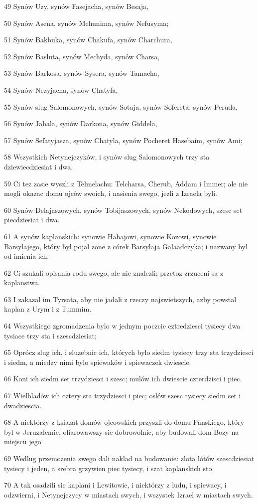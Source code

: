 \par 49 Synów Uzy, synów Fasejacha, synów Besaja,
\par 50 Synów Asena, synów Mehunima, synów Nefusyma;
\par 51 Synów Bakbuka, synów Chakufa, synów Charchura,
\par 52 Synów Basluta, synów Mechyda, synów Charsa,
\par 53 Synów Barkosa, synów Sysera, synów Tamacha,
\par 54 Synów Nezyjacha, synów Chatyfa,
\par 55 Synów slug Salomonowych, synów Sotaja, synów Sofereta, synów Peruda,
\par 56 Synów Jahala, synów Darkona, synów Giddela,
\par 57 Synów Sefatyjasza, synów Chatyla, synów Pocheret Hasebaim, synów Ami;
\par 58 Wszystkich Netynejczyków, i synów slug Salomonowych trzy sta dziewiecdziesiat i dwa.
\par 59 Ci tez zasie wyszli z Telmelachu: Telcharsa, Cherub, Addam i Immer; ale nie mogli okazac domu ojców swoich, i nasienia swego, jezli z Izraela byli.
\par 60 Synów Delajaszowych, synów Tobijaszowych, synów Nekodowych, szesc set piecdziesiat i dwa.
\par 61 A synów kaplanskich: synowie Habajowi, synowie Kozowi, synowie Barsylajego, który byl pojal zone z córek Barsylaja Galaadczyka; i nazwany byl od imienia ich.
\par 62 Ci szukali opisania rodu swego, ale nie znalezli; przetoz zrzuceni sa z kaplanstwa.
\par 63 I zakazal im Tyrsata, aby nie jadali z rzeczy najswietszych, azby powstal kaplan z Urym i z Tummim.
\par 64 Wszystkiego zgromadzenia bylo w jednym poczcie cztredziesci tysiecy dwa tysiace trzy sta i szescdziesiat;
\par 65 Oprócz slug ich, i sluzebnic ich, których bylo siedm tysiecy trzy sta trzydziesci i siedm, a miedzy nimi bylo spiewaków i spiewaczek dwiescie.
\par 66 Koni ich siedm set trzydziesci i szesc; mulów ich dwiescie czterdzisci i piec.
\par 67 Wielbladów ich cztery sta trzydziesci i piec; oslów szesc tysiecy siedm set i dwadziescia.
\par 68 A niektórzy z ksiazat domów ojcowskich przyszli do domu Panskiego, który byl w Jeruzalemie, ofiarowawszy sie dobrowolnie, aby budowali dom Bozy na miejscu jego.
\par 69 Wedlug przemozenia swego dali naklad na budowanie: zlota lótów szescdziesiat tysiecy i jeden, a srebra grzywien piec tysiecy, i szat kaplanskich sto.
\par 70 A tak osadzili sie kaplani i Lewitowie, i niektórzy z ludu, i spiewacy, i odzwierni, i Netynejczycy w miastach swych, i wszystek Izrael w miastach swych.

